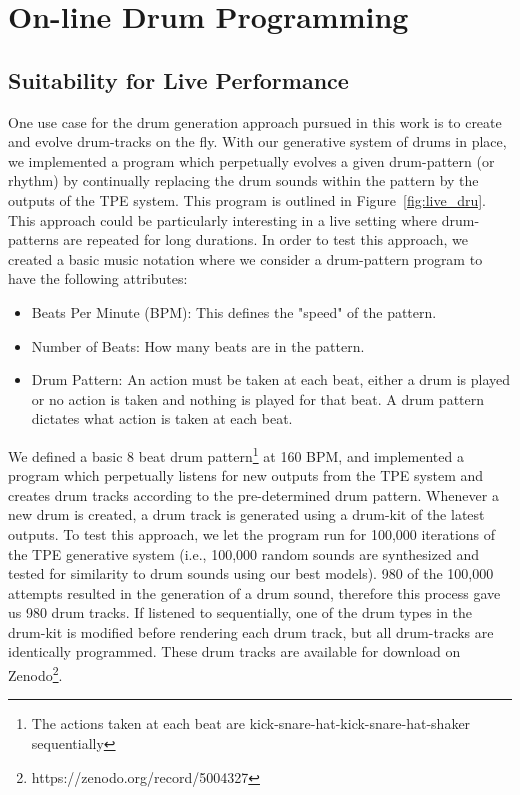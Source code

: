 \documentclass[\main/thesis.tex]{subfiles}
\begin{document}
\chapter{On-line Drum Programming}
\section{Suitability for Live Performance}
One use case for the drum generation approach pursued in this work is to create and evolve drum-tracks  on  the  fly. With our generative system of drums in place, we implemented a program which perpetually evolves a given drum-pattern (or rhythm) by continually replacing the drum sounds within the pattern by the outputs of the TPE system. This program is outlined in Figure~\ref{fig:live_dru}. This approach could be particularly interesting in a live setting where drum-patterns are repeated for long durations. In order to test this approach, we created a basic music notation where we consider a drum-pattern program to have the following attributes:

\begin{itemize}
    \item Beats Per Minute (BPM): This defines the "speed" of the pattern. 
    \item Number of Beats: How many beats are in the pattern.
    \item Drum Pattern: An action must be taken at each beat, either a drum is played or no action is taken and nothing is played for that beat. A drum pattern dictates what action is taken at each beat.
\end{itemize}

We defined a basic 8 beat drum pattern\footnote{The actions taken at each beat are kick-snare-hat-kick-snare-hat-shaker sequentially} at 160 BPM, and  implemented  a  program  which  perpetually  listens for new outputs from the TPE system and creates drum tracks according to the pre-determined drum pattern.  Whenever a new drum is created, a drum track is generated using a drum-kit of the latest outputs. To test this approach, we let the program run for 100,000 iterations of the TPE generative system (i.e., 100,000 random sounds are synthesized and tested for similarity to drum sounds using our best models). 980 of the 100,000 attempts resulted in the generation of a drum sound, therefore this process gave us 980 drum tracks. If listened to sequentially, one of the drum types in the drum-kit is modified before rendering each drum track, but all drum-tracks are identically programmed. These drum tracks are available for download on Zenodo\footnote{https://zenodo.org/record/5004327}.
\end{document}
